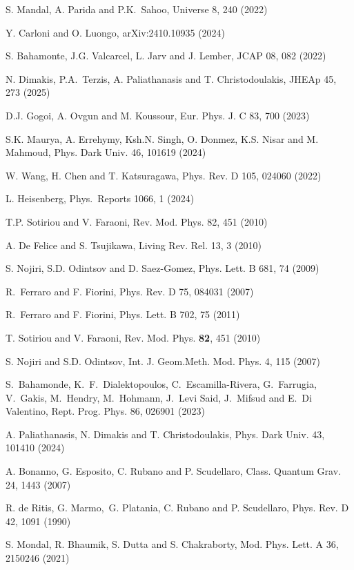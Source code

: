 \documentclass[onecolumn,superscriptaddress,secnumarabic,nobibnotes,aps,prd,nofootinbib,altaffilletter,11pt]{revtex4}
\begin{document}
\begin{thebibliography}{99}
 S. Mandal, A. Parida and P.K.\ Sahoo, Universe 8, 240 (2022)

 Y. Carloni and O. Luongo, arXiv:2410.10935 (2024)

 S. Bahamonte, J.G. Valcarcel, L. Jarv and J. Lember, JCAP 08,
082 (2022)

 N. Dimakis, P.A.\ Terzis, A. Paliathanasis and T.
Christodoulakis, JHEAp 45, 273 (2025)

 D.J. Gogoi, A. Ovgun and M. Koussour, Eur. Phys. J. C 83, 700
(2023)

 S.K. Maurya, A. Errehymy, Ksh.N. Singh, O. Donmez, K.S. Nisar
and M. Mahmoud, Phys. Dark Univ. 46, 101619 (2024)

 W. Wang, H. Chen and T. Katsuragawa, Phys. Rev. D 105, 024060
(2022)

 L. Heisenberg, Phys.\ Reports 1066, 1 (2024)

 T.P. Sotiriou and V. Faraoni, Rev. Mod. Phys. 82, 451 (2010)

 A. De Felice and S. Tsujikawa, Living Rev. Rel. 13, 3 (2010)

 S. Nojiri, S.D. Odintsov and D. Saez-Gomez, Phys. Lett. B 681,
74 (2009)

 R.\ Ferraro and F. Fiorini, Phys. Rev. D 75, 084031 (2007)

 R.\ Ferraro and F. Fiorini, Phys. Lett. B 702, 75 (2011)

T. Sotiriou and V. Faraoni, Rev. Mod. Phys. \textbf{82}, 451 (2010)

 S. Nojiri and S.D. Odintsov, Int. J. Geom.Meth. Mod. Phys. 4, 115 (2007)

S.~Bahamonde, K.~F.~Dialektopoulos, C.~Escamilla-Rivera, G.~Farrugia, V.~Gakis, M.~Hendry, M.~Hohmann, J.~Levi Said, J.~Mifsud and E.~Di Valentino, Rept. Prog. Phys. 86, 026901 (2023)

 A. Paliathanasis, N. Dimakis and T. Christodoulakis, Phys.
Dark Univ. 43, 101410 (2024)

 A. Bonanno, G. Esposito, C. Rubano and P. Scudellaro, Class.
Quantum Grav. 24, 1443 (2007)

 R. de Ritis, G. Marmo,\ G. Platania, C. Rubano and P.
Scudellaro, Phys. Rev. D 42, 1091 (1990)

 S. Mondal, R. Bhaumik, S. Dutta and S. Chakraborty, Mod. Phys.
Lett. A 36, 2150246 (2021)


\end{thebibliography}
\end{document}
